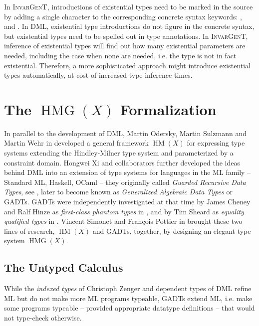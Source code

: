 \documentclass{article}
\newcommand{\tmem}[1]{{\em #1\/}}
\newcommand{\tmname}[1]{\textsc{#1}}
\newcommand{\tmop}[1]{\ensuremath{\operatorname{#1}}}
\newcommand{\tmverbatim}[1]{{\ttfamily{#1}}}
\begin{document}
In {\tmname{InvarGenT}}, introductions of existential types need to be marked
in the source by adding a single character to the corresponding concrete
syntax keywords: \tmverbatim{function}, \tmverbatim{match} and
\tmverbatim{if}. In DML, existential type introductions do not figure in the
concrete syntax, but existential types need to be spelled out in type
annotations. In {\tmname{InvarGenT}}, inference of existential types will find
out how many existential parameters are needed, including the case when none
are needed, i.e. the type is not in fact existential. Therefore, a more
sophisticated approach might introduce existential types automatically, at
cost of increased type inference times.

\section{The $\tmop{HMG} (X)$ Formalization}\label{HMGSection}

In parallel to the development of DML, Martin Odersky, Martin Sulzmann and
Martin Wehr in {\cite{HMX}} developed a general framework $\tmop{HM} (X)$ for
expressing type systems extending the Hindley-Milner type system and
parameterized by a constraint domain. Hongwei Xi and collaborators further
developed the ideas behind DML into an extension of type systems for languages
in the ML family -- Standard ML, Haskell, OCaml -- they originally called
{\tmem{Guarded Recursive Data Types}}, see {\cite{XiGRDTs}}, later to become
known as {\tmem{Generalized Algebraic Data Types}} or GADTs. GADTs were
independently investigated at that time by James Cheney and Ralf Hinze as
{\tmem{first-class phantom types}} in {\cite{CheneyHinzePhantomTypes}}, and by
Tim Sheard as {\tmem{equality qualified types}} in {\cite{Sheard04}}. Vincent
Simonet and Fran{\c c}ois Pottier in {\cite{simonet-pottier-hmg-toplas}}
brought these two lines of research, $\tmop{HM} (X)$ and GADTs, together, by
designing an elegant type system $\tmop{HMG} (X)$.

\subsection{The Untyped Calculus}

While the {\tmem{indexed types}} of Christoph Zenger {\cite{IndexedTypes}} and
dependent types of DML refine ML but do not make more ML programs typeable,
GADTs extend ML, i.e. make some programs typeable -- provided appropriate
datatype definitions -- that would not type-check otherwise.
\end{document}
